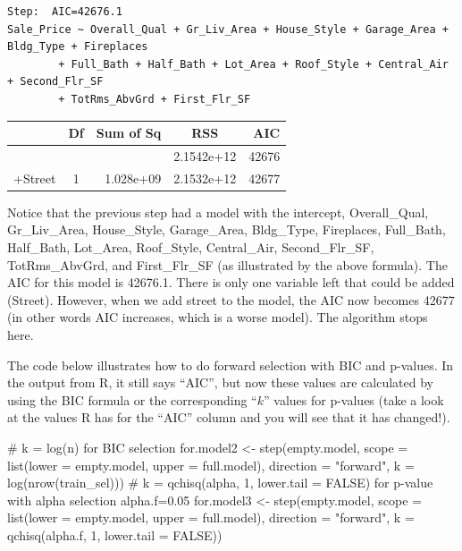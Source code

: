 \documentclass[
  letterpaper,
  DIV=11,
  numbers=noendperiod]{scrreprt}
\newenvironment{Shaded}{\begin{snugshade}}{\end{snugshade}}
\newcommand{\AttributeTok}[1]{\textcolor[rgb]{0.40,0.45,0.13}{#1}}
\newcommand{\CommentTok}[1]{\textcolor[rgb]{0.37,0.37,0.37}{#1}}
\newcommand{\ConstantTok}[1]{\textcolor[rgb]{0.56,0.35,0.01}{#1}}
\newcommand{\DecValTok}[1]{\textcolor[rgb]{0.68,0.00,0.00}{#1}}
\newcommand{\FloatTok}[1]{\textcolor[rgb]{0.68,0.00,0.00}{#1}}
\newcommand{\FunctionTok}[1]{\textcolor[rgb]{0.28,0.35,0.67}{#1}}
\newcommand{\NormalTok}[1]{\textcolor[rgb]{0.00,0.23,0.31}{#1}}
\newcommand{\OtherTok}[1]{\textcolor[rgb]{0.00,0.23,0.31}{#1}}
\newcommand{\StringTok}[1]{\textcolor[rgb]{0.13,0.47,0.30}{#1}}
\begin{document}
\begin{verbatim}
Step:  AIC=42676.1
Sale_Price ~ Overall_Qual + Gr_Liv_Area + House_Style + Garage_Area + Bldg_Type + Fireplaces 
        + Full_Bath + Half_Bath + Lot_Area + Roof_Style + Central_Air + Second_Flr_SF 
        + TotRms_AbvGrd + First_Flr_SF
\end{verbatim}

\begin{longtable}[]{@{}lcrcr@{}}
\toprule()
& Df & Sum of Sq & RSS & AIC \\
\midrule()
\endhead
& & & 2.1542e+12 & 42676 \\
+Street & 1 & 1.028e+09 & 2.1532e+12 & 42677 \\
\bottomrule()
\end{longtable}

Notice that the previous step had a model with the intercept,
Overall\_Qual, Gr\_Liv\_Area, House\_Style, Garage\_Area, Bldg\_Type,
Fireplaces, Full\_Bath, Half\_Bath, Lot\_Area, Roof\_Style,
Central\_Air, Second\_Flr\_SF, TotRms\_AbvGrd, and First\_Flr\_SF (as
illustrated by the above formula). The AIC for this model is 42676.1.
There is only one variable left that could be added (Street). However,
when we add street to the model, the AIC now becomes 42677 (in other
words AIC increases, which is a worse model). The algorithm stops here.

The code below illustrates how to do forward selection with BIC and
p-values. In the output from R, it still says ``AIC'', but now these
values are calculated by using the BIC formula or the corresponding
``\(k\)'' values for p-values (take a look at the values R has for the
``AIC'' column and you will see that it has changed!).

\begin{Shaded}
\begin{Highlighting}[]
\CommentTok{\# k = log(n) for BIC selection}
\NormalTok{for.model2 }\OtherTok{\textless{}{-}} \FunctionTok{step}\NormalTok{(empty.model,}
                   \AttributeTok{scope =} \FunctionTok{list}\NormalTok{(}\AttributeTok{lower =}\NormalTok{ empty.model,}
                               \AttributeTok{upper =}\NormalTok{ full.model),}
                   \AttributeTok{direction =} \StringTok{"forward"}\NormalTok{, }\AttributeTok{k =} \FunctionTok{log}\NormalTok{(}\FunctionTok{nrow}\NormalTok{(train\_sel))) }\CommentTok{\# k = qchisq(alpha, 1, lower.tail = FALSE) for p{-}value with alpha selection}
\NormalTok{alpha.f}\OtherTok{=}\FloatTok{0.05}
\NormalTok{for.model3 }\OtherTok{\textless{}{-}} \FunctionTok{step}\NormalTok{(empty.model,}
                   \AttributeTok{scope =} \FunctionTok{list}\NormalTok{(}\AttributeTok{lower =}\NormalTok{ empty.model,}
                                \AttributeTok{upper =}\NormalTok{ full.model),}
                   \AttributeTok{direction =} \StringTok{"forward"}\NormalTok{, }\AttributeTok{k =} \FunctionTok{qchisq}\NormalTok{(alpha.f, }\DecValTok{1}\NormalTok{, }\AttributeTok{lower.tail =} \ConstantTok{FALSE}\NormalTok{)) }
\end{Highlighting}
\end{Shaded}
\end{document}
